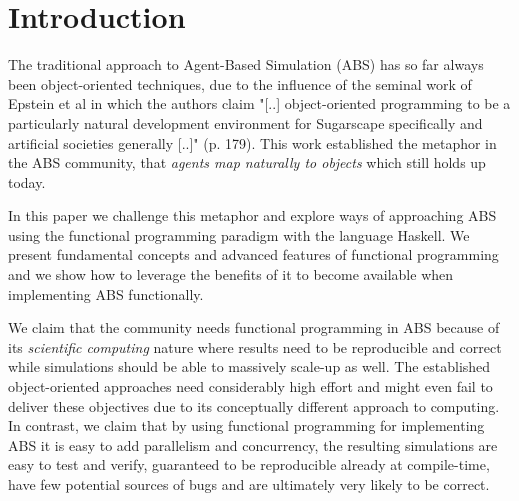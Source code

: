 \section{Introduction}


The traditional approach to Agent-Based Simulation (ABS) has so far always been object-oriented techniques, due to the influence of the seminal work of Epstein et al \cite{epstein_growing_1996} in which the authors claim "[..] object-oriented programming to be a particularly natural development environment for Sugarscape specifically and artificial societies generally [..]" (p. 179). This work established the metaphor in the ABS community, that \textit{agents map naturally to objects} \cite{north_managing_2007} which still holds up today.

In this paper we challenge this metaphor and explore ways of approaching ABS using the functional programming paradigm with the language Haskell. We present fundamental concepts and advanced features of functional programming and we show how to leverage the benefits of it \cite{hudak_history_2007} to become available when implementing ABS functionally. 

We claim that the community needs functional programming in ABS because of its \textit{scientific computing} nature where results need to be reproducible and correct while simulations should be able to massively scale-up as well. The established object-oriented approaches need considerably high effort and might even fail to deliver these objectives due to its conceptually different approach to computing. In contrast, we claim that by using functional programming for implementing ABS it is easy to add parallelism and concurrency, the resulting simulations are easy to test and verify, guaranteed to be reproducible already at compile-time, have few potential sources of bugs and are ultimately very likely to be correct.



